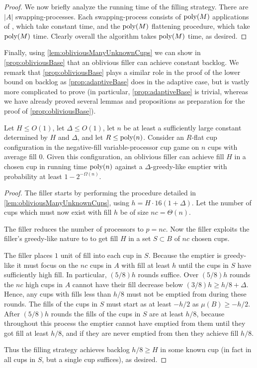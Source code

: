 \begin{proof}
We now briefly analyze the running time of the filling strategy.
There are $|A|$ swapping-processes. Each swapping-process
consists of $\operatorname{\text{poly}}(M)$ applications of \randalg, which take
constant time, and the $\operatorname{\text{poly}}(M)$ flattening procedure, which
take $\operatorname{\text{poly}}(M)$ time. Clearly overall the algorithm takes
$\operatorname{\text{poly}}(M)$ time, as desired.
  
\end{proof}

Finally, using \cref{lem:obliviousManyUnknownCups} we can show in
\cref{prop:obliviousBase} that an oblivious filler can achieve
constant backlog. We remark that \cref{prop:obliviousBase} plays a
similar role in the proof of the lower bound on backlog as
\cref{prop:adaptiveBase} does in the adaptive case, but is vastly
more complicated to prove (in particular,
\cref{prop:adaptiveBase} is trivial, whereas we have already
proved several lemmas and propositions as preparation for the
proof of \cref{prop:obliviousBase}).
\begin{proposition}
  \label{prop:obliviousBase}
  Let $H \le O(1)$, let $\Delta \le O(1)$, let $n$ be at
  least a sufficiently large constant determined by $H$ and
  $\Delta$, and let $R \le \operatorname{\text{poly}}(n)$. 
  Consider an $R$-flat cup configuration in the negative-fill variable-processor cup
  game on $n$ cups with average fill $0$.
  Given this configuration, an oblivious filler can achieve fill $H$
  in a chosen cup in running time $\operatorname{\text{poly}}(n)$ against a
  $\Delta$-greedy-like emptier with probability at least $1-2^{-\Omega(n)}.$
\end{proposition}
\begin{proof}
  The filler starts by performing the procedure detailed in
  \cref{lem:obliviousManyUnknownCups}, using $h = H\cdot
  16(1+\Delta)$. Let the number of cups which must now exist with
  fill $h$ be of size $nc = \Theta(n)$.

  The filler reduces the number of processors to $p=nc$. 
  Now the filler exploits the filler's greedy-like nature to
  to get fill $H$ in a set $S\subset B$ of $nc$ chosen cups.

  The filler places $1$ unit of fill into each cup in $S$.
  Because the emptier is greedy-like it must focus on the $nc$
  cups in $A$ with fill at least $h$ until the cups in $S$ have
  sufficiently high fill. In particular, $(5/8)h$ rounds suffice.
  Over $(5/8)h$ rounds the $nc$ high cups in $A$ cannot have
  their fill decrease below $(3/8)h \ge h/8 + \Delta$. Hence, any
  cups with fills less than $h/8$ must not be emptied from during
  these rounds. The fills of the cups in $S$ must start as at
  least $-h/2$ as $\mu(B) \ge -h/2$. After $(5/8)h$ rounds the
  fills of the cups in $S$ are at least $h/8$, because throughout
  this process the emptier cannot have emptied from them until
  they got fill at least $h/8$, and if they are never emptied
  from then they achieve fill $h/8$.

  Thus the filling strategy achieves backlog $h/8 \ge H$ in some
  known cup (in fact in all cups in $S$, but a single cup
  suffices), as desired.

\end{proof}

